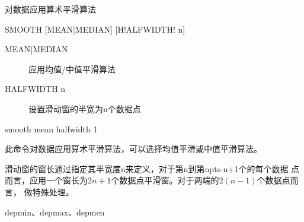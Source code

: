 \label{cmd:smooth}

对数据应用算术平滑算法

\begin{SACSTX}
SMOOTH [MEAN|MEDIAN] [H!ALFWIDTH! n]
\end{SACSTX}

\begin{description}
\item [MEAN|MEDIAN] 应用均值/中值平滑算法
\item [HALFWIDTH n] 设置滑动窗的半宽为n个数据点
\end{description}

\begin{SACDFT}
smooth mean halfwidth 1
\end{SACDFT}

此命令对数据应用算术平滑算法，可以选择均值平滑或中值平滑算法。

滑动窗的窗长通过指定其半宽度n来定义，对于第n到第npts-n+1个的每个数据
点而言，应用一个窗长为$2n+1$个数据点平滑窗。对于两端的$2(n-1)$个数据点而言，
做特殊处理。

depmin、depmax、depmen

